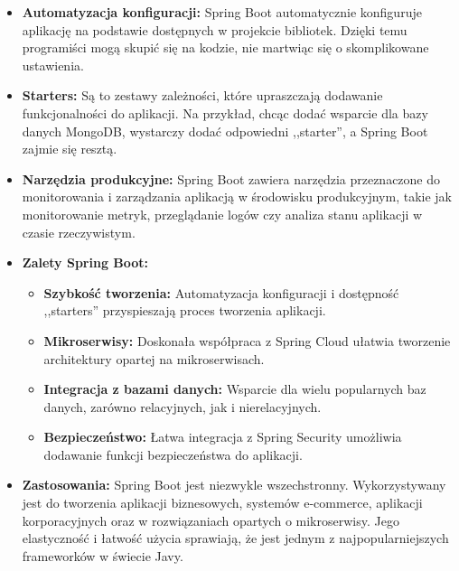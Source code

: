 \begin{itemize}
\item \textbf{Automatyzacja konfiguracji:} Spring Boot automatycznie konfiguruje aplikację na podstawie dostępnych w projekcie bibliotek. Dzięki temu programiści mogą skupić się na kodzie, nie martwiąc się o skomplikowane ustawienia.
\item \textbf{Starters:} Są to zestawy zależności, które upraszczają dodawanie funkcjonalności do aplikacji. Na przykład, chcąc dodać wsparcie dla bazy danych MongoDB, wystarczy dodać odpowiedni ,,starter'', a Spring Boot zajmie się resztą.

\item \textbf{Narzędzia produkcyjne:} Spring Boot zawiera narzędzia przeznaczone do monitorowania i zarządzania aplikacją w środowisku produkcyjnym, takie jak monitorowanie metryk, przeglądanie logów czy analiza stanu aplikacji w czasie rzeczywistym.

\item \textbf{Zalety Spring Boot:}
\begin{itemize}
    \item \textbf{Szybkość tworzenia:} Automatyzacja konfiguracji i dostępność
    ,,starters'' przyspieszają proces tworzenia aplikacji.
    \item \textbf{Mikroserwisy:} Doskonała współpraca z Spring Cloud ułatwia tworzenie architektury opartej na mikroserwisach.
    \item \textbf{Integracja z bazami danych:} Wsparcie dla wielu popularnych baz danych, zarówno relacyjnych, jak i nierelacyjnych.
    \item \textbf{Bezpieczeństwo:} Łatwa integracja z Spring Security umożliwia dodawanie funkcji bezpieczeństwa do aplikacji.
\end{itemize}

\item \textbf{Zastosowania:} Spring Boot jest niezwykle wszechstronny. Wykorzystywany jest do tworzenia aplikacji biznesowych, systemów e-commerce, aplikacji korporacyjnych oraz w rozwiązaniach opartych o mikroserwisy. Jego elastyczność i łatwość użycia sprawiają, że jest jednym z najpopularniejszych frameworków w świecie Javy\cite{springbootSpecs}.
\end{itemize}

